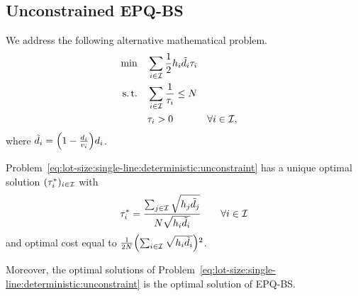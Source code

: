 
\subsection{Unconstrained EPQ-BS}
\label{sec:lot-size:single-line:models:unconstraint}


We address the following alternative mathematical problem.
\begin{subequations}\label{eq:lot-size:single-line:deterministic:unconstraint}
  \begin{align}
  \min\quad & \displaystyle\sum_{i\in\mathcal{I}} \frac{1}{2}h_i\tilde{d}_i\tau_i
  \label{eq:lot-size:single-line:deterministic:unconstraint:objective}
  \\
  \operatorname{s.t.}\quad  & \displaystyle\sum_{i\in\mathcal{I}} \frac{1}{\tau_i} \le N
  \label{eq:lot-size:single-line:deterministic:unconstraint:flexibility}
  \\
       & \tau_i > 0 && \forall i\in\mathcal{I},
  \label{eq:lot-size:single-line:deterministic:unconstraint:positivity}
  \end{align}
\end{subequations}
where $\tilde{\demand}_i=\bracket{1-\frac{\demand_i}{\rate_i}}\demand_i$.

\begin{thm}\label{thm:lot-size:single-line:deterministic:unconstraint:optimality}
Problem~\eqref{eq:lot-size:single-line:deterministic:unconstraint} has a unique optimal solution $(\tau_i^*)_{i\in\mathcal{I}}$ with
\begin{equation}
  \tau_i^*= \frac{\sum_{j\in\mathcal{I}}\sqrt{h_j\tilde{d}_j}}{N\sqrt{h_i\tilde{d}_i}}\qquad\forall i\in\mathcal{I}
\end{equation}
and optimal cost equal to $\frac{1}{2\nbsetups}\bracket{\sum_{i\in\REF}\sqrt{\holding_i\tilde{\demand_i}}}^2$.

Moreover, the optimal solutions of Problem~\eqref{eq:lot-size:single-line:deterministic:unconstraint} is the optimal solution of EPQ-BS.
\end{thm}


